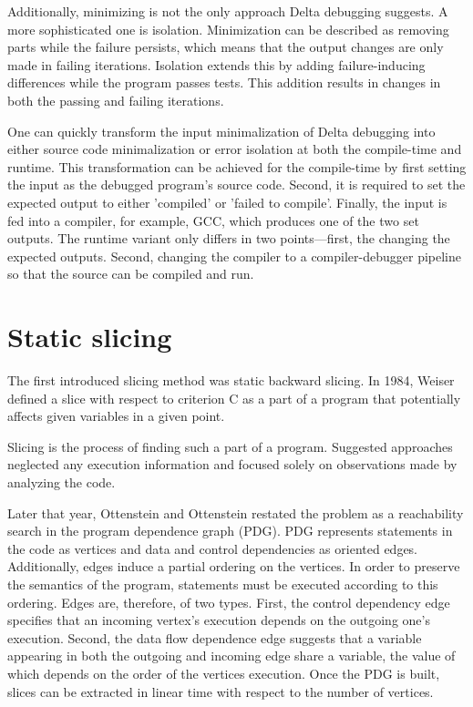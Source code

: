 \lipsum[11]

Additionally, minimizing is not the only approach Delta debugging suggests.
A more sophisticated one is isolation. Minimization can be described as removing parts
while the failure persists, which means that the output changes are only made in failing
iterations.
Isolation extends this by adding failure-inducing differences while the program passes tests.
This addition results in changes in both the passing and failing iterations.

One can quickly transform the input minimalization of Delta debugging into either source
code minimalization or error isolation at both the compile-time and runtime.
This transformation can be achieved for the compile-time by first setting the input
as the debugged program's source code. 
Second, it is required to set the expected
output to either 'compiled' or 'failed to compile'. 
Finally, the input is fed into a compiler, for example, GCC, which produces
one of the two set outputs. 
The runtime variant only differs in two points—first, the changing the expected outputs. 
Second, changing the compiler to a compiler-debugger pipeline so that the source 
can be compiled and run.

\section{Static slicing}

The first introduced slicing method was static backward slicing. 
In 1984, Weiser defined a slice with respect to criterion C 
as a part of a program that potentially affects given variables in a given point. 

\lipsum[11]

Slicing is the process of finding such a part of a program. 
Suggested approaches neglected any execution information and 
focused solely on observations made by analyzing the code.

\lipsum[11]

Later that year, Ottenstein and Ottenstein restated the problem as a reachability
search in the program dependence graph (PDG).
PDG represents statements in the code as vertices and data and control
dependencies as oriented edges. 
Additionally, edges induce a partial ordering on the vertices. 
In order to preserve the semantics of the program, statements must be executed 
according to this ordering. Edges are, therefore, of two types. 
First, the control dependency edge specifies that an incoming vertex's 
execution depends on the outgoing one's execution. 
Second, the data flow dependence edge suggests that a variable appearing
in both the outgoing and incoming edge share a variable,
the value of which depends on the order of the vertices execution.
Once the PDG is built, slices can be extracted in linear time 
with respect to the number of vertices.

